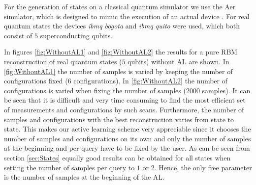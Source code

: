 \documentclass[pra,aps,showpacs,groupedaddress,superscriptaddress,twocolumn,toc=flat,biblatex,footinbib]{revtex4-1}
\begin{document}
For the generation of states on a classical quantum simulator we use the Aer simulator, which is designed to  mimic the execution of an actual device \cite{IBM}. For real quantum states the devices \textit{ibmq bogota} and \textit{ibmq quito} were used, which both consist of $5$ superconducting qubits. 

In figures \ref{fig:WithoutAL1} and \ref{fig:WithoutAL2} the results for a pure RBM reconstruction of real quantum states ($5$ qubits) without AL are shown. In \ref{fig:WithoutAL1} the number of samples is varied by keeping the number of configurations fixed ($6$ configurations). In \ref{fig:WithoutAL2} the number of configurations is varied when fixing the number of samples ($2000$ samples). It can be seen that it is difficult and very time consuming to find the most efficient set of measurements and configurations by such scans. Furthermore, the number of samples and configurations with the best reconstruction varies from state to state. This makes our active learning scheme very appreciable since it chooses the number of samples and configurations on its own and only the number of samples at the beginning and per query have to be fixed by the user. As can be seen from section \ref{sec:States} equally good results can be obtained for all states when setting the number of samples per query to $1$ or $2$. Hence, the only free parameter is the number of samples at the beginning of the AL.  



\end{document}
